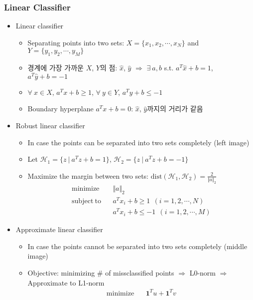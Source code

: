 \subsubsection*{Linear Classifier}
\begin{itemize}
    \item Linear classifier
    \begin{itemize}
        \item Separating points into two sets: $X=\{x_1,x_2,\cdots,x_N\}$ and $Y=\{y_1,y_2,\cdots,y_M\}$
        \item 경계에 가장 가까운 $X$, $Y$의 점: $\hat{x}$, $\hat{y}$ $\Rightarrow$ $\exists~a,b$ s.t. $a^T\hat{x}+b=1$, $a^T\hat{y}+b=-1$
        \item $\forall~x\in X$, $a^Tx+b\geq1$, $\forall~y\in Y$, $a^Ty+b\leq-1$
        \item Boundary hyperplane $a^Tx+b=0$: $\hat{x}$, $\hat{y}$까지의 거리가 같음
    \end{itemize}
    \newpage
    \item Robust linear classifier
    \begin{itemize}
        \item In case the points can be separated into two sets completely (left image)
        \item Let $\mathcal{H}_1=\{z~|~a^Tz+b=1\}$, $\mathcal{H}_2=\{z~|~a^Tz+b=-1\}$
        \item Maximize the margin between two sets: $\mathrm{dist}(\mathcal{H}_1,\mathcal{H}_2)=\frac{2}{\Vert a\Vert_2}$
            $$ \begin{aligned}
                \mathrm{minimize}~~&~~\Vert a\Vert_2 \\
                \mathrm{subject~to}~~&~~a^Tx_i+b\geq1~~(i=1,2,\cdots,N) \\
                    &~~a^Tx_i+b\leq-1~~(i=1,2,\cdots,M)
            \end{aligned} $$
    \end{itemize}
    \item Approximate linear classifier
    \begin{itemize}
        \item In case the points cannot be separated into two sets completely (middle image)
        \item Objective: minimizing \# of missclassified points $\Rightarrow$ L0-norm $\Rightarrow$ Approximate to L1-norm
            $$ \begin{aligned}
                \mathrm{minimize}~~&~~\mathbf{1}^Tu+\mathbf{1}^Tv \\

\end{aligned}$$
\end{itemize}
\end{itemize}
